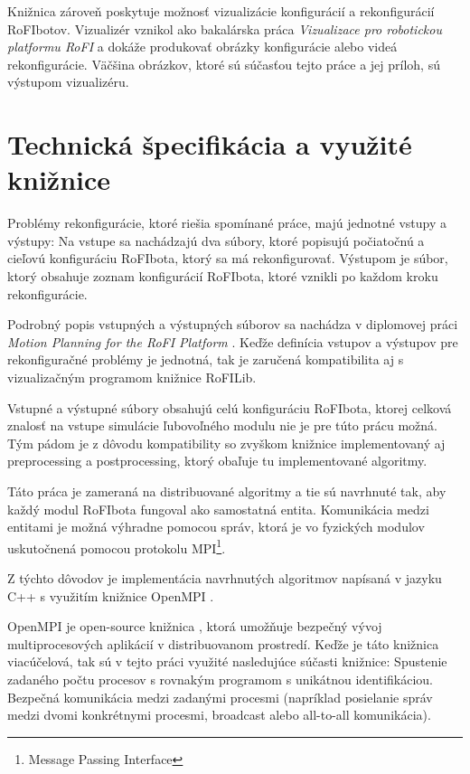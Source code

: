\documentclass[
  digital, %
  oneside, %
  table,   %
  lof,     %
  nolot,     %
]{fithesis3}
\begin{document}
Knižnica zároveň poskytuje možnosť vizualizácie konfigurácií a rekonfigurácií RoFIbotov. Vizualizér vznikol ako bakalárska práca \textit{Vizualizace pro robotickou platformu RoFI} \cite{nausovaBachelorThesis} a dokáže produkovať obrázky konfigurácie alebo videá rekonfigurácie. Väčšina obrázkov, ktoré sú súčasťou tejto práce a jej príloh, sú výstupom vizualizéru. 

\section{Technická špecifikácia a využité knižnice}
\label{sec:libraries}
Problémy rekonfigurácie, ktoré riešia spomínané práce, majú jednotné vstupy a výstupy: Na vstupe sa nachádzajú dva súbory, ktoré popisujú počiatočnú a cieľovú konfiguráciu RoFIbota, ktorý sa má rekonfigurovať. Výstupom je súbor, ktorý obsahuje zoznam konfigurácií RoFIbota, ktoré vznikli po každom kroku rekonfigurácie. 

Podrobný popis vstupných a výstupných súborov sa nachádza v diplomovej práci \textit{Motion Planning for the RoFI Platform} \cite{vozarovaMasterThesis}. Keďže definícia vstupov a výstupov pre rekonfiguračné problémy je jednotná, tak je zaručená kompatibilita aj s vizualizačným programom knižnice RoFILib. 

Vstupné a výstupné súbory obsahujú celú konfiguráciu RoFIbota, ktorej celková znalosť na vstupe simulácie ľubovoľného modulu nie je pre túto prácu možná. Tým pádom je z dôvodu kompatibility so zvyškom knižnice implementovaný aj preprocessing a postprocessing, ktorý obaľuje tu implementované algoritmy. 

Táto práca je zameraná na distribuované algoritmy a tie sú navrhnuté tak, aby každý modul RoFIbota fungoval ako samostatná entita. Komunikácia medzi entitami je možná výhradne pomocou správ, ktorá je vo fyzických modulov uskutočnená pomocou protokolu MPI\footnote{Message Passing Interface}. 

Z týchto dôvodov je implementácia navrhnutých algoritmov napísaná v jazyku C++ s využitím knižnice OpenMPI \cite{openMPILibrary}. 

OpenMPI je open-source knižnica \cite{openMPIGit}, ktorá umožňuje bezpečný vývoj multiprocesových aplikácií v distribuovanom prostredí. Keďže je táto knižnica viacúčelová, tak sú v tejto práci využité nasledujúce súčasti knižnice: Spustenie zadaného počtu procesov s rovnakým programom s unikátnou identifikáciou. Bezpečná komunikácia medzi zadanými procesmi (napríklad posielanie správ medzi dvomi konkrétnymi procesmi, broadcast alebo all-to-all komunikácia). 
\end{document}
